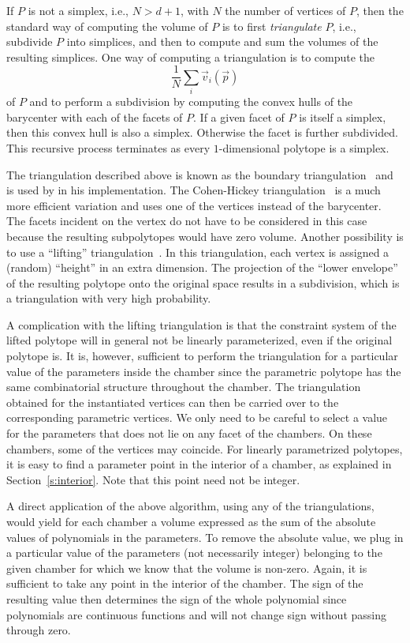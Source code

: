 If $P$ is not a simplex, i.e., $N > d+1$, with $N$ the number of
vertices of $P$, then the standard way of computing the volume of $P$
is to first {\em triangulate} $P$, i.e., subdivide $P$ into simplices,
and then to compute and sum the volumes of the resulting simplices.
One way of computing a triangulation is to
compute the 
$$
\frac 1 N \sum_i \vec v_i(\vec p)
$$
of $P$
and to perform a subdivision by computing the convex hulls
of the barycenter with each of the facets of $P$.
If a given facet of $P$ is itself a simplex, then this convex hull
is also a simplex.  Otherwise the facet is further subdivided.
This recursive process terminates as every $1$-dimensional polytope
is a simplex.

The triangulation described above is known as
the boundary triangulation~ and is used
by  in his implementation.
The Cohen-Hickey triangulation~
is a much more efficient variation and uses one of the vertices
instead of the barycenter.  The facets incident on the vertex
do not have to be considered in this case because the resulting subpolytopes
would have zero volume.
Another possibility is to use a
``lifting'' triangulation~.
In this triangulation, each vertex is assigned a (random) ``height'' in
an extra dimension.
The projection of the ``lower envelope'' of the resulting polytope onto
the original space results in a subdivision, which is a triangulation
with very high probability.

A complication with the lifting triangulation is that the constraint system
of the lifted polytope will in general not be linearly parameterized,
even if the original polytope is.
It is, however, sufficient to perform the triangulation for a particular
value of the parameters inside the chamber since the parametric polytope
has the same combinatorial structure throughout the chamber.
The triangulation obtained for the instantiated vertices can then
be carried over to the corresponding parametric vertices.
We only need to be careful to select a value for the parameters that
does not lie on any facet of the chambers.  On these chambers, some
of the vertices may coincide.
For linearly parametrized polytopes, it is easy to find a parameter
point in the interior of a chamber, as explained in Section~\ref{s:interior}.
Note that this point need not be integer.

A direct application of the above algorithm, using any of the triangulations,
would yield for each chamber
a volume expressed as the sum of the absolute values of polynomials in
the parameters.  To remove the absolute value, we plug in a particular
value of the parameters (not necessarily integer)
belonging to the given chamber for which we know that the volume is non-zero.
Again, it is sufficient to take any point in the interior of the chamber.
The sign of the resulting value then determines the sign of the whole
polynomial since polynomials are continuous functions and will not change
sign without passing through zero.
